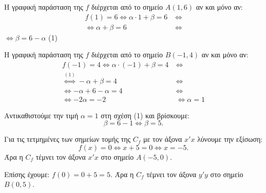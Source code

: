 
\begin{alist}
\item Η γραφική παράσταση της $f$ διέρχεται από το σημείο $A(1, 6)$ αν και μόνο αν:
\begin{align*}
f(1) = 6 \Leftrightarrow \alpha \cdot 1 + \beta = 6 \ &\Leftrightarrow \\
\Leftrightarrow \alpha + \beta = 6 \ &\Leftrightarrow
\end{align*}
$\Leftrightarrow \beta = 6 - \alpha$ (1)

Η γραφική παράσταση της $f$ διέρχεται από το σημείο $B(-1, 4)$ αν και μόνο αν:
\begin{align*}
f(-1) = 4 \Leftrightarrow \alpha \cdot (-1) + \beta = 4 \ &\Leftrightarrow \\
\stackrel{(1)}{\Leftrightarrow} -\alpha + \beta = 4 \ &\Leftrightarrow \\
\Leftrightarrow -\alpha + 6 - \alpha = 4 \ &\Leftrightarrow \\
\Leftrightarrow -2\alpha = -2 &\Leftrightarrow \alpha = 1
\end{align*}

Αντικαθιστούμε την τιμή $\alpha = 1$ στη σχέση (1) και βρίσκουμε:
\[\beta = 6 - 1 \Leftrightarrow \beta = 5.\]

\item Για τις τετμημένες των σημείων τομής της $C_f$ με τον άξονα $x'x$ λύνουμε την εξίσωση:
\[f(x) = 0 \Leftrightarrow x + 5 = 0 \Leftrightarrow x = -5.\]
Άρα η $C_f$ τέμνει τον άξονα $x'x$ στο σημείο $A(-5, 0)$.

Επίσης έχουμε:
$f(0) = 0 + 5 = 5$.
Άρα η $C_f$ τέμνει τον άξονα $y'y$ στο σημείο $B(0, 5)$.
\end{alist}

